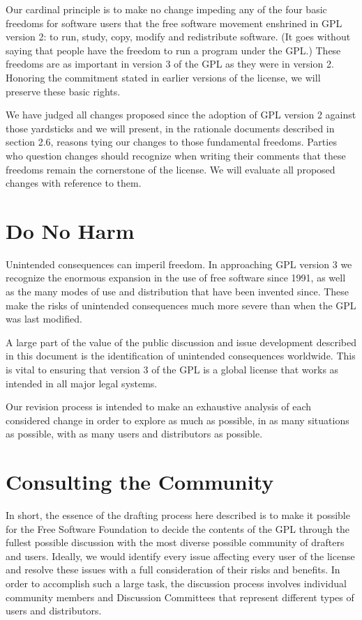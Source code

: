 Our cardinal principle is to make no change impeding any of the four basic
freedoms for software users that the free software movement enshrined in
GPL version 2: to run, study, copy, modify and redistribute software. (It
goes without saying that people have the freedom to run a program under
the GPL.) These freedoms are as important in version 3 of the GPL as they
were in version 2. Honoring the commitment stated in earlier versions of
the license, we will preserve these basic rights.

We have judged all changes proposed since the adoption of GPL version 2
against those yardsticks and we will present, in the rationale documents
described in section 2.6, reasons tying our changes to those fundamental
freedoms. Parties who question changes should recognize when
writing their comments that these freedoms remain the cornerstone of the
license. We will evaluate all proposed changes with reference to them.

\section{Do No Harm}

Unintended consequences can imperil freedom. In approaching GPL version 3
we recognize the enormous expansion in the use of free software
since 1991, as well as the many modes of use and distribution that have
been invented since. These make the risks of unintended consequences
much more severe than when the GPL was last modified.

A large part of the value of the public discussion and issue development
described in this document is the identification of unintended consequences
worldwide. This is vital to ensuring that version 3 of the GPL is a
global license that works as intended in all major legal systems.

Our revision process is intended to make an exhaustive analysis of
each considered change in order to explore as much as possible, in as
many situations as possible, with as many users and distributors as possible.

\section{Consulting the Community}

In short, the essence of the drafting process here described is to make
it possible for the Free Software Foundation to decide the contents of the
GPL through the fullest possible discussion with the most diverse possible
community of drafters and users. Ideally, we would identify every issue
affecting every user of the license and resolve these issues with a full
consideration of their risks and benefits. In order to accomplish such a
large task, the discussion process involves individual community members
and Discussion Committees that represent different types of users and
distributors.

